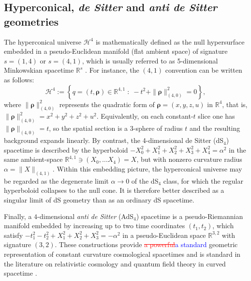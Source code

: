 \documentclass[preprint,12pt]{elsarticle}
\renewcommand{\vec}[1]{\boldsymbol{#1}}
\begin{document}

\subsection{Hyperconical, \textit{de Sitter} and \textit{anti de Sitter} geometries}

The hyperconical universe $\mathcal{H}^4$ is mathematically defined as the null hypersurface embedded in a pseudo-Euclidean manifold (flat ambient space) of signature $s=(1,4)$ or $s=(4,1)$, which is usually referred to as 5-dimensional Minkowskian spacetime $\mathbb{R}^s$ \cite{monjo2017hyperconical, Monjo_2024}. For instance, the $(4,1)$ convention can be written as follows:
\begin{equation}
\mathcal{H}^4:=\left\{q=(t,\vec{\rho})\in\mathbb{R}^{4,1}\;:\;-t^2+\|\vec{\rho}\|_{\scriptscriptstyle{(4,0)}}^2=0\right\},
\end{equation}where $\|\vec{\rho}\|_{\scriptscriptstyle{(4,0)}} ^2$ represents the quadratic form of $\vec{\rho} = (x,y,z,u)$ in $\mathbb{R}^4$, that is, $\|\vec{\rho}\|_{\scriptscriptstyle{(4,0)}} ^2 = x^2+y^2+z^2+u^2$. Equivalently, on each constant-$t$ slice one has $\|\vec{\rho}\|_{\scriptscriptstyle{(4,0)}} =t$, so the spatial section is a 3-sphere of radius $t$ and the resulting background expands linearly. By contrast, the 4-dimensional de Sitter (dS${}_4$) spacetime is described by the hyperboloid $-X_0^2+X_1^2+X_2^2+X_3^2+X_4^2=\alpha^2$ in the same ambient-space $\mathbb{R}^{4,1} \ni (X_0, \dots X_4) = X$, but with nonzero curvature radius $\alpha = \|X\|_{\scriptscriptstyle{(4,1)}}$. Within this embedding picture, the hyperconical universe may be regarded as the degenerate limit $\alpha\to0$ of the dS${}_4$ class, for which the regular hyperboloid collapses to the null cone. It is therefore better described as a singular limit of dS geometry than as an ordinary dS spacetime.

Finally, a $4$-dimensional \textit{anti de Sitter} (AdS${}_4$) spacetime is a pseudo-Riemannian manifold embedded by increasing up to two time coordinates $(t_1, t_2)$, which satisfy $-t_1^2-t_2^2+X_1^2+X_2^2+X_3^2 = -\alpha^2$ in a pseudo-Euclidean space $\mathbb{R}^{3,2}$ with signature $(3,2)$.  These constructions provide \textcolor{red}{\sout{a powerful}}\textcolor{blue}{a standard} geometric representation of constant curvature cosmological spacetimes and is standard in the literature on relativistic cosmology and quantum field theory in curved spacetime \cite{hawking1973large, spradlin2001les}.
\end{document}
